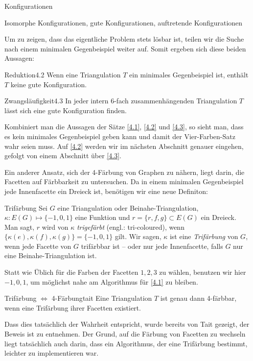 \begin{section}{Konfigurationen}
\begin{definition}{Isomorphe Konfigurationen, gute Konfigurationen, auftretende Konfigurationen}
 \end{definition}

   
 Um zu zeigen, dass das eigentliche Problem stets lösbar ist, teilen wir die Suche nach einem minimalen Gegenbeispiel weiter auf. Somit ergeben sich diese beiden Aussagen:
   
 \begin{satzl}{Reduktion}{4.2}
  Wenn eine Triangulation $T$ ein minimales Gegenbeispiel ist, enthält $T$ keine gute Konfiguration.
 \end{satzl}
   
 \begin{satzl}{Zwangsläufigkeit}{4.3}
  In jeder intern 6-fach zusammenhängenden Triangulation $T$ lässt sich eine gute Konfiguration finden.
 \end{satzl}
   
 Kombiniert man die Aussagen der Sätze \ref{4.1}, \ref{4.2} und \ref{4.3}, so sieht man, dass es kein minimales Gegenbeispiel geben kann und damit der Vier-Farben-Satz wahr seien muss. Auf \ref{4.2} werden wir im nächsten Abschnitt genauer eingehen, gefolgt von einem Abschnitt über \ref{4.3}. 
 
 Ein anderer Ansatz, sich der 4-Färbung von Graphen zu nähern, liegt darin, die Facetten auf Färbbarkeit zu untersuchen. Da in einem minimalen Gegenbeispiel jede Innenfacette ein Dreieck ist, benötigen wir eine neue Definiton:
 
 \begin{definition}{Trifärbung}
  Sei $G$ eine Triangulation oder Beinahe-Triangulation, $\kappa:E(G) \mapsto \{-1,0,1\}$ eine Funktion und $r=\{r,f,g\} \subset E(G)$ ein Dreieck. Man sagt, $r$ wird von $\kappa$ \textit{trigefärbt} (engl.: tri-coloured), wenn $\{\kappa(e),\kappa(f),\kappa(g)\} = \{-1,0,1\}$ gilt. Wir sagen, $\kappa$ ist eine \textit{Trifärbung} von $G$, wenn jede Facette von $G$ trifärbbar ist -- oder nur jede Innenfacette, falls $G$ nur eine Beinahe-Triangulation ist.
 \end{definition}

 Statt wie Üblich für die Farben der Facetten $1,2,3$ zu wählen, benutzen wir hier $-1,0,1$, um möglichst nahe am Algorithmus für \ref{4.1} zu bleiben.
 
 \begin{satzl}{Trifärbung $\Leftrightarrow$ 4-Färbung}{tait}
  Eine Triangulation $T$ ist genau dann 4-färbbar, wenn eine Trifärbung ihrer Facetten existiert.
 \end{satzl}
 
 Dass dies tatsächlich der Wahrheit entspricht, wurde bereits von Tait gezeigt, der Beweis ist \cite{TaitTri} zu entnehmen. Der Grund, auf die Färbung von Facetten zu wechseln liegt tatsächlich auch darin, dass ein Algorithmus, der eine Trifärbung bestimmt, leichter zu implementieren war. \cite[Seite 7]{FourRSST} 
 

\end{section}
